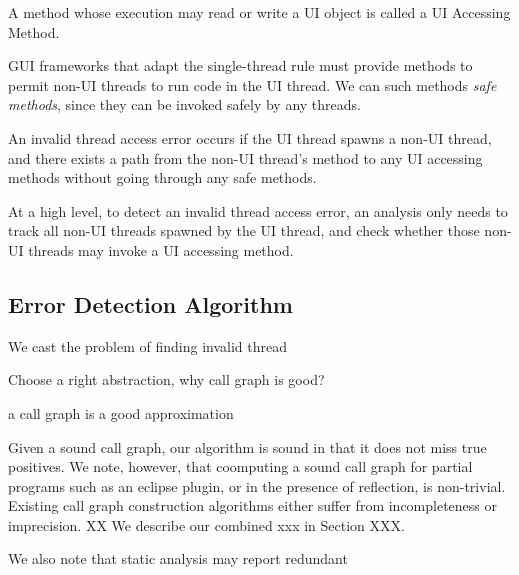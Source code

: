  { A method
whose execution may read or write a UI object is called a UI Accessing Method.}\vspace{1mm}

 {GUI frameworks that
adapt the single-thread rule must provide methods to permit non-UI threads
to run code in the UI thread. We can such methods \textit{safe methods}, since
they can be invoked safely by any threads.}\vspace{1mm}

 {An invalid
thread access error occurs if the UI thread spawns a non-UI thread, and there
exists a path from the non-UI thread's  method to any UI accessing methods
without going through any safe methods. }\vspace{2mm}

At a high level, to detect an invalid thread access error, an analysis only needs to track all
non-UI threads spawned by the UI thread, and check whether those non-UI threads
may invoke a UI accessing method.

\subsection{Error Detection Algorithm}

We cast the problem of finding invalid thread

Choose a right abstraction, why call graph is good?

a call graph is a good approximation

Given a sound call graph, our algorithm is sound in that it does not
miss true positives. We note, however, that coomputing a sound
call graph for partial programs such as an eclipse plugin,
or in the presence of reflection, is non-trivial. Existing
call graph construction algorithms either suffer from incompleteness
or imprecision.  XX We describe our combined xxx in Section XXX.

We also note that static analysis may report redundant


